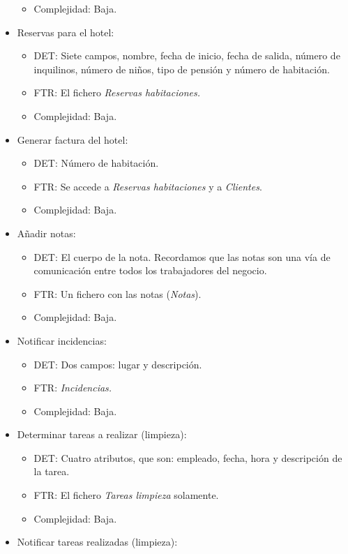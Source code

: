 \documentclass[spanish,a4paper,12pt]{report}	%
\begin{document}
\begin{itemize}
\begin{itemize}
			\item{Complejidad:} Baja.
		\end{itemize}
		\item{Reservas para el hotel:} 
		\begin{itemize}
 			\item{DET:} Siete campos, nombre, fecha de inicio, fecha de salida, número de inquilinos, número de niños, tipo de pensión y número de habitación.
			\item{FTR:} El fichero \textit{Reservas habitaciones.}
			\item{Complejidad:} Baja.	
		\end{itemize}		
		\item{Generar factura del hotel:} 
		\begin{itemize}
 			\item{DET:} Número de habitación.
			\item{FTR:} Se accede a \textit{Reservas habitaciones} y a \textit{Clientes}.
			\item{Complejidad:} Baja.
		\end{itemize}
		\item{Añadir notas:} 
		\begin{itemize}
 			\item{DET:} El cuerpo de la nota. Recordamos que las notas son una vía de comunicación entre todos los trabajadores del negocio.
			\item{FTR:} Un fichero con las notas (\textit{Notas}).
			\item{Complejidad:} Baja.
		\end{itemize}
		\item{Notificar incidencias:} 
		\begin{itemize}
 			\item{DET:} Dos campos: lugar y descripción.
			\item{FTR:} \textit{Incidencias.}
			\item{Complejidad:} Baja.
		\end{itemize}
		\item{Determinar tareas a realizar (limpieza):} 
		\begin{itemize}
 			\item{DET:} Cuatro atributos, que son: empleado, fecha, hora y descripción de la tarea.
			\item{FTR:} El fichero \textit{Tareas limpieza} solamente.
			\item{Complejidad:} Baja.
		\end{itemize}
		\item{Notificar tareas realizadas (limpieza):} 

\end{itemize}
\end{document}
